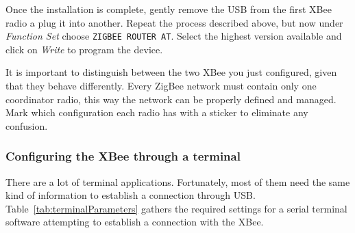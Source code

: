Once the installation is complete, gently remove the USB from the first XBee radio a plug it into another. Repeat the process described above, but now under \emph{Function Set} choose \texttt{ZIGBEE ROUTER AT}. Select the highest version available and click on \emph{Write} to program the device.

It is important to distinguish between the two XBee you just configured, given that they behave differently. Every ZigBee network must contain only one coordinator radio, this way the network can be properly defined and managed. Mark which configuration each radio has with a sticker to eliminate any confusion.

\begin{table}[htbp]
	\centering
	\caption{XBee AT modes}
	\label{tab:xbeeATModes}
\end{table}

\subsubsection{Configuring the XBee through a terminal }

There are a lot of terminal applications. Fortunately, most of them need the same kind of information to establish a connection through USB. Table~\ref{tab:terminalParameters} gathers the required settings for a serial terminal software attempting to establish a connection with the XBee.

\begin{table}[htbp]
	\centering
	\caption{Default terminal settings for establishing a connection with an XBee}
	\label{tab:terminalParameters}
\end{table}

